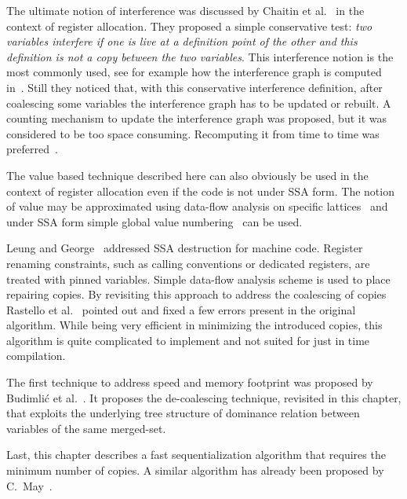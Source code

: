 The ultimate notion of interference was discussed by Chaitin et al.~\cite{Chaitin81} in the context of register allocation. 
They proposed a simple conservative test: 
\emph{two variables interfere if one is live at a definition point of the other and this definition is not a copy between the two variables}. 
This interference notion is the most commonly used, see for example how the interference graph is computed in~\cite{appel:2002:modern}. 
Still they noticed that, with this conservative interference definition, after coalescing some variables the interference graph has to be updated or rebuilt. 
A counting mechanism to update the interference graph was proposed, but it was considered to be too space consuming. 
Recomputing it from time to time was preferred~\cite{Chaitin81,Chaitin82}.

The value based technique described here can also obviously be used in the context of register allocation even if the code is not under SSA form. 
The notion of value may be approximated using data-flow analysis on specific lattices~\cite{AlpernWZ88} and under SSA form simple global value numbering~\cite{Rosen88} can be used.

Leung and George~\cite{leung:1999:ssa_mach} addressed SSA destruction for machine code. 
Register renaming constraints, such as calling conventions or dedicated registers, are treated with pinned variables. 
Simple data-flow analysis scheme is used to place repairing copies. 
By revisiting this approach to address the coalescing of copies Rastello et al.~\cite{Rastello:2004:CGO} pointed out and fixed a few errors present in the original algorithm. 
While being very efficient in minimizing the introduced copies, this algorithm is quite complicated to implement and not suited for just in time compilation.

The first technique to address speed and memory footprint was proposed by Budimli\'{c} et al.~\cite{Budimlic02}. 
It proposes the de-coalescing technique, revisited in this chapter, that exploits the underlying tree structure of dominance relation between variables of the same merged-set.

Last, this chapter describes a fast sequentialization algorithm that requires the minimum number of copies. 
A similar algorithm has already been proposed by C.~May~\cite{May89}.






